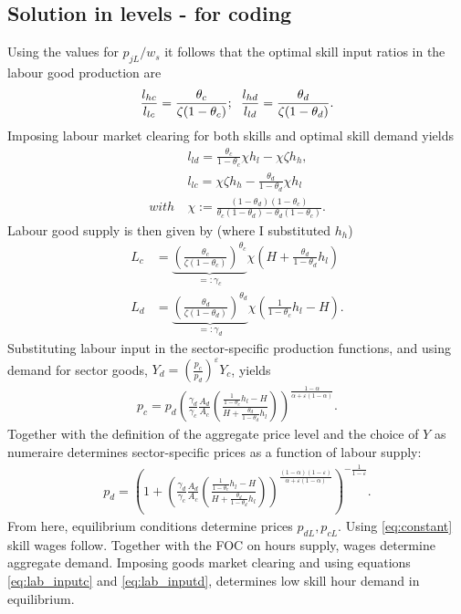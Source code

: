 \subsection{Solution in levels - for coding}
Using the values for $p_{jL}/w_s$ it follows that the optimal skill input ratios in the labour good production are
\begin{align*}
\frac{l_{hc}}{l_{lc}}=\frac{\theta_c}{\zeta (1-\theta_c)}; \hspace{2mm} \frac{l_{hd}}{l_{ld}}=\frac{\theta_d}{\zeta (1-\theta_d)}.
\end{align*}
Imposing labour market clearing for both skills and optimal skill demand  yields 
\begin{align*}
&l_{ld}=\frac{\theta_c}{1-\theta_c}\chi h_l-\chi \zeta h_h,\\
& l_{lc}=\chi \zeta h_h-\frac{\theta_d}{1-\theta_d}\chi h_l\\
with \ & \chi:= \frac{(1-\theta_d)(1-\theta_c)}{\theta_c(1-\theta_d)-\theta_d(1-\theta_c)}.
\end{align*}
Labour good supply is then given by (where I substituted $h_h$)
\begin{align}
L_c&=\underbrace{\left(\frac{\theta_c}{\zeta(1-\theta_c)}\right)^{\theta_c}}_{=:\gamma_c}\chi\left(H +\frac{\theta_d}{1-\theta_d} h_l\right)\label{eq:lab_inputc} \\
L_d&= \underbrace{\left(\frac{\theta_d}{\zeta (1-\theta_d)}\right)^{\theta_d}}_{=:\gamma_d}\chi\left(\frac{1}{1-\theta_c} h_l-H\right).\label{eq:lab_inputd}
\end{align}
Substituting labour input in the sector-specific production functions, and using demand for sector goods, $Y_d=\left(\frac{p_c}{p_d}\right)^\varepsilon Y_c$, yields
\begin{align*}
p_c =p_d\left(\frac{\gamma_d}{\gamma_c}\frac{A_d}{A_c}\left(\frac{\frac{1}{1-\theta_c}h_l-H}{H+\frac{\theta_d}{1-\theta_d}h_l}\right)\right)^{\frac{1-\alpha}{\alpha+\varepsilon(1-\alpha)}}.
\end{align*}
Together with the definition of the aggregate price level and the choice of $Y$ as numeraire determines sector-specific prices as a function of labour supply:
\begin{align*}
p_d= \left(1+\left(\frac{\gamma_d}{\gamma_c}\frac{A_d}{A_c}\left(\frac{\frac{1}{1-\theta_c}h_l-H}{H+\frac{\theta_d}{1-\theta_d}h_l}\right)\right)^{\frac{(1-\alpha)(1-\varepsilon)}{\alpha+\varepsilon(1-\alpha)}}\right)^{-\frac{1}{1-\varepsilon}}.
\end{align*}
From here,  equilibrium conditions determine prices $p_{dL}, p_{cL}$. Using \ref{eq:constant} skill wages follow. Together with the FOC on hours supply, wages determine aggregate demand. Imposing goods market clearing and using equations \ref{eq:lab_inputc} and \ref{eq:lab_inputd}, determines low skill hour demand in equilibrium.

